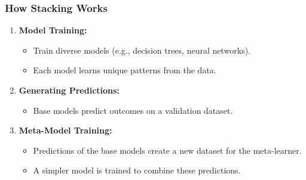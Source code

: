 \documentclass[aspectratio=169]{beamer}
\begin{document}
\begin{frame}[fragile]
    \frametitle{How Stacking Works}
    \begin{enumerate}
        \item \textbf{Model Training:}
        \begin{itemize}
            \item Train diverse models (e.g., decision trees, neural networks).
            \item Each model learns unique patterns from the data.
        \end{itemize}

        \item \textbf{Generating Predictions:}
        \begin{itemize}
            \item Base models predict outcomes on a validation dataset.
        \end{itemize}

        \item \textbf{Meta-Model Training:}
        \begin{itemize}
            \item Predictions of the base models create a new dataset for the meta-learner.
            \item A simpler model is trained to combine these predictions.
        \end{itemize}
    \end{enumerate}
\end{frame}
\end{document}
